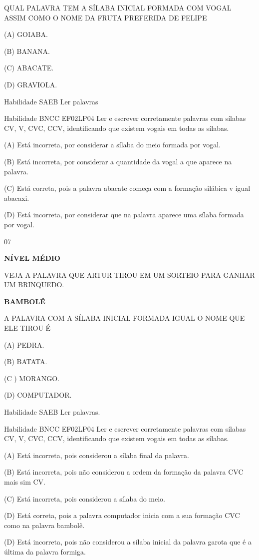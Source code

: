 {{\protect\hypertarget{_Hlk129270648}{}{}QUAL PALAVRA TEM A SÍLABA INICIAL
FORMADA COM VOGAL ASSIM COMO O NOME DA FRUTA PREFERIDA DE FELIPE

(A) GOIABA.

(B) BANANA.

(C) ABACATE.

(D) GRAVIOLA.

Habilidade SAEB Ler palavras

Habilidade BNCC EF02LP04 Ler e escrever corretamente palavras com
sílabas CV, V, CVC, CCV, identificando que existem vogais em todas as
sílabas.

(A) Está incorreta, por considerar a sílaba do meio formada por vogal.

(B) Está incorreta, por considerar a quantidade da vogal a que aparece
na palavra.

(C) Está correta, pois a palavra abacate começa com a formação silábica
v igual abacaxi.

(D) Está incorreta, por considerar que na palavra aparece uma sílaba
formada por vogal.

\num{07}

\textbf{NÍVEL MÉDIO}

VEJA A PALAVRA QUE ARTUR TIROU EM UM SORTEIO PARA GANHAR UM BRINQUEDO.

\textbf{BAMBOLÉ}

A PALAVRA COM A SÍLABA INICIAL FORMADA IGUAL O NOME QUE ELE TIROU É

(A) PEDRA.

(B) BATATA.

(C ) MORANGO.

(D) COMPUTADOR.

\protect\hypertarget{_Hlk129508691}{}{}Habilidade SAEB Ler palavras.

Habilidade BNCC EF02LP04 Ler e escrever corretamente palavras com
sílabas CV, V, CVC, CCV, identificando que existem vogais em todas as
sílabas.

(A) Está incorreta, pois considerou a sílaba final da palavra.

(B) Está incorreta, pois não considerou a ordem da formação da palavra
CVC mais sim CV.

(C) Está incorreta, pois considerou a sílaba do meio.

(D) Está correta, pois a palavra computador inicia com a sua formação
CVC como na palavra bambolê.

(D) Está incorreta, pois não considerou a sílaba inicial da palavra
garota que é a última da palavra formiga.

}}

